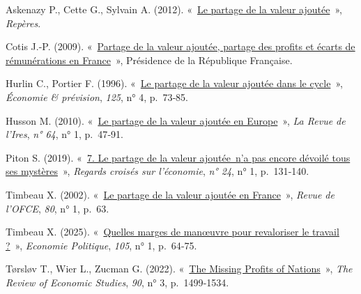 \documentclass[
  french,
  9pt,
  a4paper,
]{article}
\newlength{\cslhangindent}
\newenvironment{CSLReferences}[2] %
 {\begin{list}{}{%
  \setlength{\itemindent}{0pt}
  \setlength{\leftmargin}{0pt}
  \setlength{\parsep}{0pt}
  \ifodd #1
   \setlength{\leftmargin}{\cslhangindent}
   \setlength{\itemindent}{-1\cslhangindent}
  \fi
  \setlength{\itemsep}{#2\baselineskip}}}
 {\end{list}}
\begin{document}
\label{refs}
\begin{CSLReferences}{0}{1}
Askenazy P., Cette G., Sylvain A. (2012).
{«~\href{https://doi.org/10.3917/dec.asken.2012.01}{Le partage de la
valeur ajoutée}~»}, \emph{Repères}.

Cotis J.-P. (2009).
{«~\href{https://www.vie-publique.fr/rapport/30455-partage-valeur-ajoutee-partage-profits-et-ecarts-de-remuneration}{Partage
de la valeur ajoutée, partage des profits et écarts de rémunérations en
France}~»}, Présidence de la République Française.

Hurlin C., Portier F. (1996).
{«~\href{https://doi.org/10.3406/ecop.1996.5809}{Le partage de la valeur
ajoutée dans le cycle}~»}, \emph{Économie \& prévision}, \emph{125}, n°
4, p.~73‑85.

Husson M. (2010). {«~\href{https://doi.org/10.3917/rdli.064.0047}{Le
partage de la valeur ajoutée en Europe}~»}, \emph{La Revue de l'Ires},
\emph{n° 64}, n° 1, p.~47‑91.

Piton S. (2019). {«~\href{https://doi.org/10.3917/rce.024.0131}{7. Le
partage de la valeur ajoutée~n{'}a pas encore dévoilé tous ses
mystères}~»}, \emph{Regards croisés sur l'économie}, \emph{n° 24}, n° 1,
p.~131‑140.

Timbeau X. (2002). {«~\href{https://doi.org/10.3917/reof.080.0063}{Le
partage de la valeur ajoutée en France}~»}, \emph{Revue de l'OFCE},
\emph{80}, n° 1, p.~63.

Timbeau X. (2025).
{«~\href{https://shs.cairn.info/revue-l-economie-politique-2025-1-page-64?lang=fr}{Quelles
marges de manœuvre pour revaloriser le travail ?}~»}, \emph{Economie
Politique}, \emph{105}, n° 1, p.~64‑75.

Tørsløv T., Wier L., Zucman G. (2022).
{«~\href{https://doi.org/10.1093/restud/rdac049}{The Missing Profits of
Nations}~»}, \emph{The Review of Economic Studies}, \emph{90}, n° 3,
p.~1499‑1534.

\end{CSLReferences}
\end{document}
